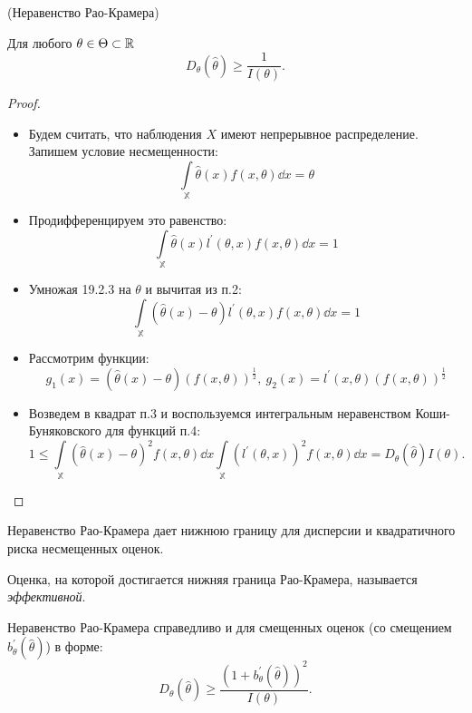 \begin{theorem}(Неравенство Рао-Крамера)

	Для любого $\theta \in \Theta \subset \mathbb{R}$
	\[
		D_{\theta}(\hat{\theta}) \geqslant \frac{1}{I(\theta)}
	.\]
\end{theorem}
\begin{proof}
	\enewline
        \begin{itemize}
		\item Будем считать, что наблюдения $X$ имеют непрерывное распределение. Запишем условие несмещенности:
			\[
				\int\limits_{\mathbb{X}} \hat{\theta}(x)f(x,\theta) \dd x = \theta
			\]
		\item Продифференцируем это равенство:
			\[
				\int\limits_{\mathbb{X}} \hat{\theta}(x)l^{'}(\theta,x)f(x,\theta) \dd x = 1
			\]
		\item Умножая 19.2.3 на $\theta$ и вычитая из п.2:
			\[
				\int\limits_{\mathbb{X}} (\hat{\theta}(x) - \theta)l^{'}(\theta,x)f(x,\theta) \dd x = 1
			\]
		\item Рассмотрим функции:
			\[
				g_1(x) = (\hat{\theta}(x) - \theta)(f(x, \theta))^{\frac{1}{2}},~ g_2(x) = l^{'}(x, \theta)(f(x, \theta))^{\frac{1}{2}}
			\]
		\item Возведем в квадрат п.3 и воспользуемся интегральным неравенством Коши-Буняковского для функций п.4:
			\[
				1 \leqslant \int\limits_{\mathbb{X}} (\hat{\theta}(x) - \theta)^2f(x,\theta) \dd x \int\limits_{\mathbb{X}} (l^{'}(\theta,x))^2f(x,\theta) \dd x = D_{\theta}(\hat{\theta})I(\theta)
			.\]
	\end{itemize}
\end{proof}

Неравенство Рао-Крамера дает нижнюю границу для дисперсии и квадратичного риска несмещенных оценок.

\begin{definition}
	Оценка, на которой достигается нижняя граница Рао-Крамера, называется \textit{эффективной}.
\end{definition}

\begin{remark}
	Неравенство Рао-Крамера справедливо и для смещенных оценок (со смещением $b^{'}_{\theta}(\hat{\theta})$) в форме:
	\[
		D_{\theta}(\hat{\theta}) \geqslant \frac{(1 + b^{'}_{\theta}(\hat{\theta}))^2}{I(\theta)}
	.\]
\end{remark}

